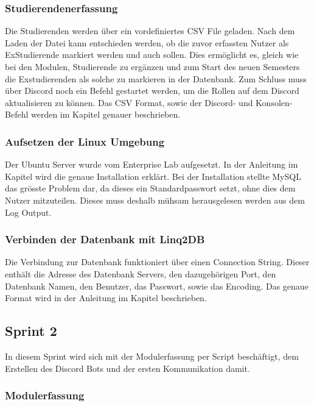 \documentclass[a4paper, table]{article}
\begin{document}
\subsubsection{Studierendenerfassung}
Die Studierenden werden über ein vordefiniertes \gls{CSV} File geladen. 
Nach dem Laden der Datei kann entschieden werden, ob die zuvor erfassten Nutzer als ExStudierende markiert werden und auch sollen. 
Dies ermöglicht es, gleich wie bei den Modulen, Studierende zu ergänzen und zum Start des neuen Semesters die Exstudierenden als solche zu markieren in der Datenbank. 
Zum Schluss muss über Discord noch ein Befehl gestartet werden, um die Rollen auf dem Discord aktualisieren zu können. 
Das \gls{CSV} Format, sowie der Discord- und Konsolen-Befehl werden im Kapitel  genauer beschrieben.

\subsubsection{Aufsetzen der Linux Umgebung}
Der Ubuntu Server wurde vom Enterprise Lab aufgesetzt. 
In der Anleitung im Kapitel  wird die genaue Installation erklärt. 
Bei der Installation stellte MySQL das grösste Problem dar, da dieses ein Standardpasswort setzt, ohne dies dem Nutzer mitzuteilen. 
Dieses muss deshalb mühsam herausgelesen werden aus dem Log Output.

\subsubsection{Verbinden der Datenbank mit Linq2DB}
Die Verbindung zur Datenbank funktioniert über einen Connection String. 
Dieser enthält die Adresse des Datenbank Servers, den dazugehörigen Port, den Datenbank Namen, den Benutzer, das Passwort, sowie das Encoding. 
Das genaue Format wird in der Anleitung im Kapitel beschrieben.

\newpage
\subsection{Sprint 2}
In diesem Sprint wird sich mit der Modulerfassung per Script beschäftigt,
dem Erstellen des Discord Bots und der ersten Kommunikation damit.

\subsubsection{Modulerfassung}
\end{document}
